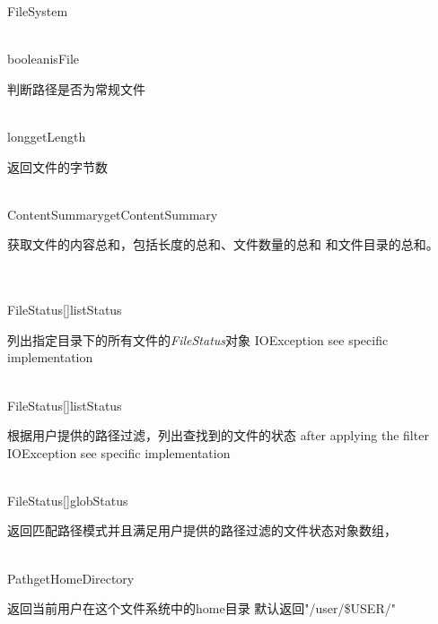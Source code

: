 \begin{XeClass}{FileSystem}
  \begin{XeMethod}{\XePublic\\ }{boolean}{isFile}
       
 判断路径是否为常规文件

  \end{XeMethod}

  \begin{XeMethod}{\XePublic\\ }{long}{getLength}
       
 返回文件的字节数

  \end{XeMethod}

  \begin{XeMethod}{\XePublic\\ }{ContentSummary}{getContentSummary}
       
 获取文件的内容总和，包括长度的总和、文件数量的总和
 和文件目录的总和。

  \end{XeMethod}

  \begin{XeMethod}{\XePublic\\ \XeAbstract\\ }{FileStatus[]}{listStatus}
       
 列出指定目录下的所有文件的\emph{FileStatus}对象
 IOException see specific implementation

  \end{XeMethod}

  \begin{XeMethod}{\XePublic\\ }{FileStatus[]}{listStatus}
       
 根据用户提供的路径过滤，列出查找到的文件的状态
 after applying the filter
 IOException see specific implementation

  \end{XeMethod}

  \begin{XeMethod}{\XePublic\\ }{FileStatus[]}{globStatus}
       
 返回匹配路径模式并且满足用户提供的路径过滤的文件状态对象数组，

  \end{XeMethod}

  \begin{XeMethod}{\XePublic\\ }{Path}{getHomeDirectory}
       
 返回当前用户在这个文件系统中的home目录
 默认返回"/user/{\$}USER/"


\end{XeMethod}
\end{XeClass}
